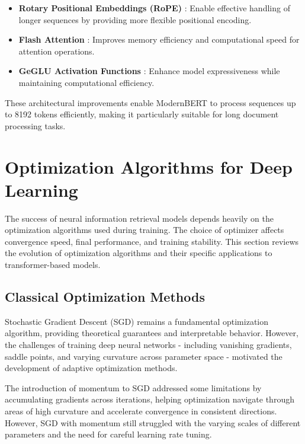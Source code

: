 \begin{itemize}
    \item \textbf{Rotary Positional Embeddings (RoPE)} \cite{su2023roformerenhancedtransformerrotary}: Enable effective handling of longer sequences by providing more flexible positional encoding.
    \item \textbf{Flash Attention} \cite{dao2022flashattentionfastmemoryefficientexact}: Improves memory efficiency and computational speed for attention operations.
    \item \textbf{GeGLU Activation Functions} \cite{shazeer2020gluvariantsimprovetransformer}: Enhance model expressiveness while maintaining computational efficiency.
\end{itemize}

These architectural improvements enable ModernBERT to process sequences up to 8192 tokens efficiently, making it particularly suitable for long document processing tasks.

\section{Optimization Algorithms for Deep Learning}

The success of neural information retrieval models depends heavily on the optimization algorithms used during training. The choice of optimizer affects convergence speed, final performance, and training stability. This section reviews the evolution of optimization algorithms and their specific applications to transformer-based models.

\subsection{Classical Optimization Methods}

Stochastic Gradient Descent (SGD) remains a fundamental optimization algorithm, providing theoretical guarantees and interpretable behavior. However, the challenges of training deep neural networks - including vanishing gradients, saddle points, and varying curvature across parameter space - motivated the development of adaptive optimization methods.

The introduction of momentum to SGD addressed some limitations by accumulating gradients across iterations, helping optimization navigate through areas of high curvature and accelerate convergence in consistent directions. However, SGD with momentum still struggled with the varying scales of different parameters and the need for careful learning rate tuning.

